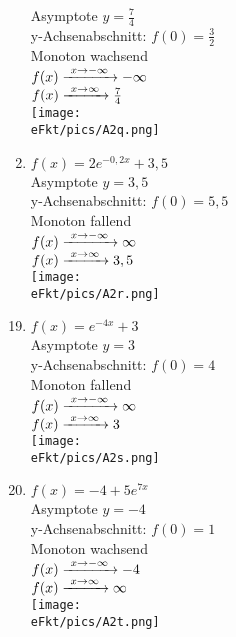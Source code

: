 \begin{Answer}[ref=eFktA2]
\begin{minipage}{\textwidth}
\begin{minipage}[t]{0.49\textwidth}
\begin{enumerate}[label=\alph*)]
				Asymptote \(y=\frac{7}{4}\)\\
				y-Achsenabschnitt: \(f(0)=\frac{3}{2}\)\\
				Monoton wachsend\\
				\(f(x)\xrightarrow{\hphantom{\ }x\to-\infty\hphantom{\ }}-\infty\)\\
				\(f(x)\xrightarrow{\hphantom{\ }x\to\infty\hphantom{\ }}\frac{7}{4}\)\\
				\texttt{[image: \\eFkt/pics/A2q.png]}
				\item \(f(x)=2e^{-0,2x}+3,5\)\\
				Asymptote \(y=3,5\)\\
				y-Achsenabschnitt: \(f(0)=5,5\)\\
				Monoton fallend\\
				\(f(x)\xrightarrow{\hphantom{\ }x\to-\infty\hphantom{\ }}\infty\)\\
				\(f(x)\xrightarrow{\hphantom{\ }x\to\infty\hphantom{\ }}3,5\)\\
				\texttt{[image: \\eFkt/pics/A2r.png]}
			\end{enumerate}
		\end{minipage}
		\begin{minipage}[t]{0.49\textwidth}
			\begin{enumerate}[label=\alph*)]
				\setcounter{enumi}{18}
				\item \(f(x)=e^{-4x}+3\)\\
				Asymptote \(y=3\)\\
				y-Achsenabschnitt: \(f(0)=4\)\\
				Monoton fallend\\
				\(f(x)\xrightarrow{\hphantom{\ }x\to-\infty\hphantom{\ }}\infty\)\\
				\(f(x)\xrightarrow{\hphantom{\ }x\to\infty\hphantom{\ }}3\)\\
				\texttt{[image: \\eFkt/pics/A2s.png]}
				\item \(f(x)=-4+5e^{7x}\)\\
				Asymptote \(y=-4\)\\
				y-Achsenabschnitt: \(f(0)=1\)\\
				Monoton wachsend\\
				\(f(x)\xrightarrow{\hphantom{\ }x\to-\infty\hphantom{\ }}-4\)\\
				\(f(x)\xrightarrow{\hphantom{\ }x\to\infty\hphantom{\ }}\infty\)\\
				\texttt{[image: \\eFkt/pics/A2t.png]}

\end{enumerate}
\end{minipage}
\end{minipage}
\end{Answer}
